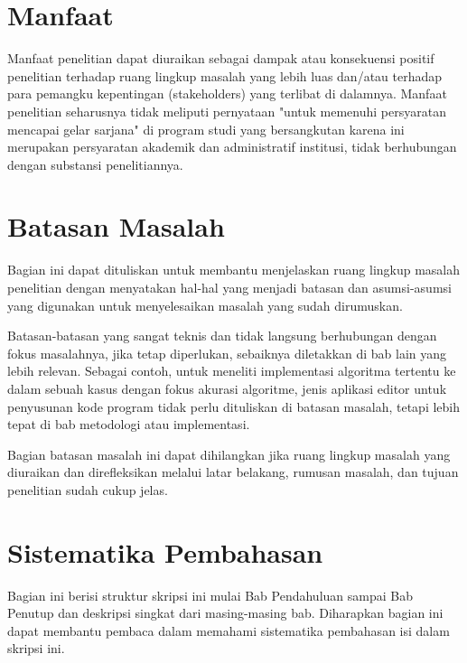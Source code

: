 \section{Manfaat}

Manfaat penelitian dapat diuraikan sebagai dampak atau konsekuensi positif penelitian terhadap ruang lingkup masalah yang lebih luas dan/atau terhadap para pemangku kepentingan (stakeholders) yang terlibat di dalamnya. Manfaat penelitian seharusnya tidak meliputi pernyataan "untuk memenuhi persyaratan mencapai gelar sarjana" di program studi yang bersangkutan karena ini merupakan persyaratan akademik dan administratif  institusi, tidak berhubungan dengan substansi penelitiannya.

\section{Batasan Masalah}

Bagian ini dapat dituliskan untuk membantu menjelaskan ruang lingkup masalah penelitian dengan menyatakan hal-hal yang menjadi batasan dan asumsi-asumsi yang digunakan untuk menyelesaikan masalah yang sudah dirumuskan. 

Batasan-batasan yang sangat teknis dan tidak langsung berhubungan dengan fokus masalahnya, jika tetap diperlukan, sebaiknya diletakkan di bab lain yang lebih relevan. Sebagai contoh, untuk meneliti implementasi algoritma tertentu ke dalam sebuah kasus dengan fokus akurasi algoritme, jenis aplikasi editor untuk penyusunan kode program tidak perlu dituliskan di batasan masalah, tetapi lebih tepat di bab metodologi atau implementasi.   

Bagian batasan masalah ini dapat dihilangkan jika ruang lingkup masalah yang diuraikan dan direfleksikan melalui latar belakang, rumusan masalah, dan tujuan penelitian sudah cukup jelas.

\section{Sistematika Pembahasan}

Bagian ini berisi struktur skripsi ini mulai Bab Pendahuluan sampai Bab Penutup dan deskripsi singkat dari masing-masing bab. Diharapkan bagian ini dapat membantu pembaca dalam memahami sistematika pembahasan isi dalam skripsi ini. 